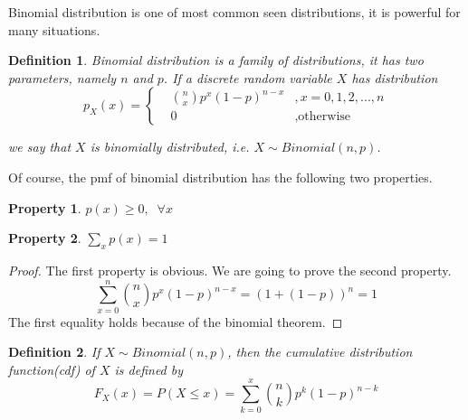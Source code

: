 \documentclass{article}
\newtheorem{definition}{Definition}
\newtheorem{property}{Property}
\begin{document}
Binomial distribution is one of most common seen distributions, it is powerful for many situations.

\begin{definition}
	Binomial distribution is a family of distributions, it has two parameters, namely $n$ and $p$. If a discrete random variable $X$ has distribution
	\[ p_X(x) = \left\{ \begin{matrix}
	&\binom{n}{x} p^x(1-p)^{n-x} &,x=0,1,2,...,n\\
	&0 &,\text{otherwise}
	\end{matrix}     \right. \]
	
	we say that $X$ is binomially distributed, i.e. $X\sim Binomial(n,p)$.
\end{definition} 
Of course, the pmf of binomial distribution has the following two properties.
\begin{property}
	$ p(x) \geq 0,\;\;\forall x $
\end{property}
\begin{property}
	$ \sum_x p(x) = 1 $
\end{property}
\begin{proof}
	The first property is obvious. We are going to prove the second property. 
	\[\sum_{x=0}^{n}\binom{n}{x} p^x(1-p)^{n-x} = (1+ (1-p))^n = 1 \] 
	The first equality holds because of the binomial theorem.
\end{proof}

\begin{definition}
	If $X\sim Binomial(n,p)$, then the cumulative distribution function(cdf) of $X$ is defined by
	\[ F_X(x) = P(X\leq x) = \sum_{k=0}^x \binom{n}{k} p^k(1-p)^{n-k} \]
\end{definition}
\end{document}
